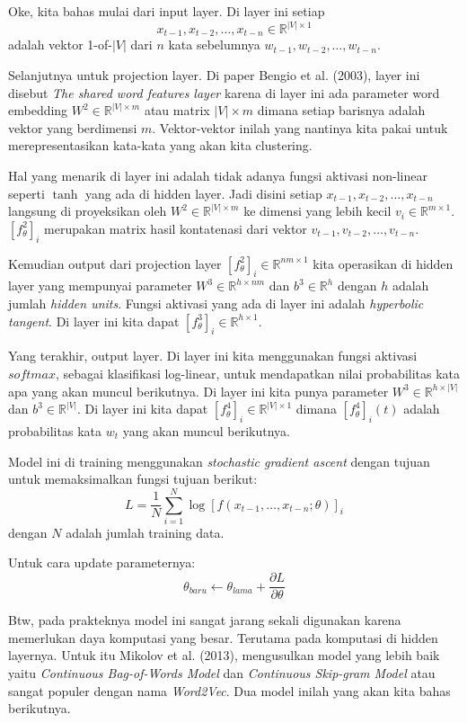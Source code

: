 \documentclass[a4paper,12pt]{tufte-handout}
\newcommand{\R}{\mathbb{R}} %
\begin{document}
Oke, kita bahas mulai dari input layer. Di layer ini setiap 
$$x_{t-1}, x_{t-2},\ldots,x_{t-n} \in \R^{|V| \times 1}$$
adalah vektor 1-of-$|V|$
dari $n$ kata sebelumnya $w_{t-1}, w_{t-2},\ldots,w_{t-n}$.

Selanjutnya untuk projection layer. Di paper Bengio et al. (2003), 
layer ini 
disebut \textit{The shared word features layer} karena di layer ini ada
parameter word embedding $W^{2} \in \R^{|V|\times m}$ atau matrix 
$|V|\times m$ dimana setiap barisnya adalah vektor yang
berdimensi $m$. Vektor-vektor inilah yang nantinya kita pakai untuk
merepresentasikan kata-kata yang akan kita clustering.

Hal yang menarik di layer ini adalah tidak adanya fungsi aktivasi 
non-linear seperti $\tanh$ yang ada di hidden layer. Jadi disini 
setiap $x_{t-1}, x_{t-2},\ldots,x_{t-n}$ langsung di proyeksikan 
oleh $W^{2} \in \R^{|V|\times m}$ ke dimensi yang lebih kecil 
$v_{i} \in \R^{m\times 1}$. $\left[ f_{\theta}^{2} \right]_{i}$ 
merupakan matrix hasil 
kontatenasi dari vektor $v_{t-1}, v_{t-2},\ldots,v_{t-n}$.

Kemudian output dari projection layer 
$\left[ f_{\theta}^{2} \right]_{i} \in \R^{nm\times 1}$ 
kita operasikan di hidden layer yang mempunyai parameter 
$W^{3} \in \R^{h \times nm}$ dan $b^{3} \in \R^{h}$
dengan $h$ adalah jumlah \textit{hidden units}.
Fungsi aktivasi yang ada di layer ini adalah \textit{hyperbolic tangent}.
Di layer ini kita dapat 
$\left[ f_{\theta}^{3} \right]_{i} \in \R^{h\times 1}$.

Yang terakhir, output layer. Di layer ini kita menggunakan
fungsi aktivasi $softmax$, sebagai klasifikasi log-linear,
untuk mendapatkan nilai probabilitas kata apa yang akan 
muncul berikutnya. Di layer ini kita punya 
parameter $W^{3} \in \R^{h \times |V|}$ dan $b^{3} \in \R^{|V|}$. 
Di layer ini kita dapat 
$\left[ f_{\theta}^{4} \right]_{i} \in \R^{|V|\times 1}$
dimana $\left[ f_{\theta}^{4} \right]_{i}\left(t\right)$ adalah
probabilitas kata $w_{t}$ yang akan muncul berikutnya.

Model ini di training menggunakan \textit{stochastic gradient ascent}
dengan tujuan untuk memaksimalkan fungsi tujuan berikut:
$$
L = \frac{1}{N}\sum_{i=1}^{N}\log{
  \left[f(x_{t-1}, \ldots, x_{t-n}; \theta)\right]_{i}
}
$$
dengan $N$ adalah jumlah training data.

Untuk cara update parameternya:
$$
\theta_{baru} \leftarrow \theta_{lama} + \frac{\partial{L}}{\partial{\theta}}
$$

Btw, pada prakteknya model ini sangat jarang sekali digunakan karena
memerlukan daya komputasi yang besar. Terutama pada komputasi di hidden
layernya. Untuk itu Mikolov et al. (2013), mengusulkan model yang lebih
baik yaitu \textit{Continuous Bag-of-Words Model} dan 
\textit{Continuous Skip-gram Model} atau sangat
populer dengan nama \textit{Word2Vec}. Dua model inilah yang akan kita bahas 
berikutnya.
\end{document}

